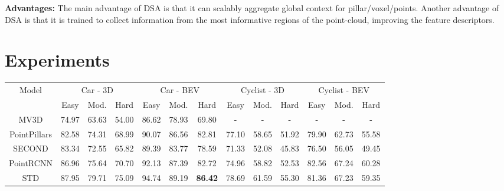 \documentclass[10pt,twocolumn,letterpaper]{article}
\begin{document}
\textbf{Advantages:} The main advantage of DSA is that it can scalably aggregate global context for pillar/voxel/points. Another advantage of DSA is that it is trained to collect information from the most informative regions of the point-cloud, improving the feature descriptors. 
 \section{Experiments}
\setlength{\tabcolsep}{7.6pt}
\begin{table*}[t]
    \centering
    \footnotesize
    \begin{tabular*}{\textwidth}{c||ccc|ccc|ccc|ccc}
        \hline
        \multirow{2}{*}{Model} &
        \multicolumn{3}{c|}{Car - 3D} &
        \multicolumn{3}{c|}{Car - BEV} &
        \multicolumn{3}{c|}{Cyclist - 3D} &
        \multicolumn{3}{c}{Cyclist - BEV}  \\
        & Easy & Mod. & Hard &
        Easy & Mod. & Hard &
        Easy & Mod. & Hard &
        Easy & Mod. & Hard \\
        \hline

MV3D \cite{MV3D} & 
        74.97 & 63.63 & 54.00 &
        86.62 & 78.93 & 69.80 &
        - & - & - & - & - & - \\









        PointPillars \cite{pointpillars} & 
        82.58 & 74.31 & 68.99 & 
        90.07 & 86.56 & 82.81 & 
        77.10 & 58.65 & 51.92 &
        79.90 & 62.73 & 55.58 \\
        
        SECOND \cite{SECOND} & 
        83.34 & 72.55 & 65.82 &
        89.39 & 83.77 & 78.59 &
        71.33 & 52.08 & 45.83 &
        76.50 & 56.05 & 49.45 \\
        
        PointRCNN \cite{PointRCNN} & 
        86.96 & 75.64 & 70.70 &
        92.13 & 87.39 & 82.72 &
        74.96 & 58.82 & 52.53 &
        82.56 & 67.24 & 60.28 \\
        
        STD \cite{STD} & 
        87.95 & 79.71 & 75.09 &
        94.74 & 89.19 & \textbf{86.42} &
        78.69 & 61.59 & 55.30 &
        81.36 & 67.23 & 59.35 \\
        





\end{tabular*}
\end{table*}
\end{document}
